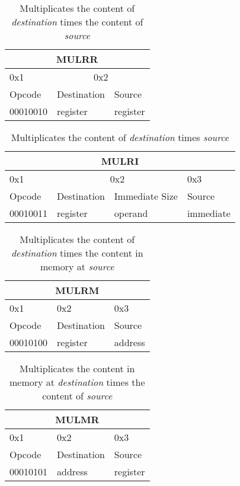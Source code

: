 \documentclass{article}
\begin{document}
\begin{table}[H]
  \centering
  \begin{tabular} { | p{2cm} | | p{2cm} | p{2cm} |}
    \hline
    \multicolumn{3}{|c|}{MULRR}\\
    \hline
    0x1 & \multicolumn{2}{|c|}{0x2}\\
    \hline
    Opcode & Destination & Source\\
    00010010 & register & register\\
    \hline
  \end{tabular}
  \caption{Multiplicates the content of \textit{destination} times the content of \textit{source}}
\end{table}

\begin{table}[H]
  \centering
  \begin{tabular} { | p{2cm} | | p{2cm} | p{} | | p{2cm} |}
    \hline
    \multicolumn{4}{|c|}{MULRI}\\
    \hline
    0x1 & \multicolumn{2}{|c|}{0x2} & 0x3\\
    \hline
    Opcode & Destination & Immediate Size & Source\\
    00010011 & register & operand & immediate\\
    \hline
  \end{tabular}
  \caption{Multiplicates the content of \textit{destination} times \textit{source}}
\end{table}

\begin{table}[H]
  \centering
  \begin{tabular} { | p{2cm} | | p{2cm} | p{2cm} |}
    \hline
    \multicolumn{3}{|c|}{MULRM}\\
    \hline
    0x1 & 0x2 & 0x3\\
    \hline
    Opcode & Destination & Source\\
    00010100 & register & address\\
    \hline
  \end{tabular}
  \caption{Multiplicates the content of \textit{destination} times the content in memory at \textit{source}}
\end{table}

\begin{table}[H]
  \centering
  \begin{tabular} { | p{2cm} | | p{2cm} | p{2cm} |}
    \hline
    \multicolumn{3}{|c|}{MULMR}\\
    \hline
    0x1 & 0x2 & 0x3\\
    \hline
    Opcode & Destination & Source\\
    00010101 & address & register\\
    \hline
  \end{tabular}
  \caption{Multiplicates the content in memory at \textit{destination} times the content of \textit{source}}
\end{table}
\end{document}
